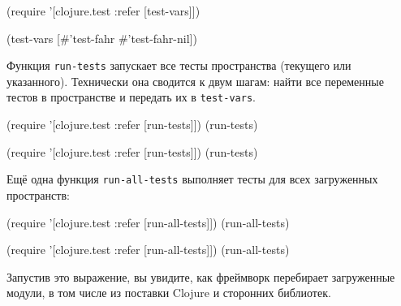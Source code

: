 \else

\begin{english}
  \begin{clojure}
(require '[clojure.test :refer [test-vars]])

(test-vars [#'test-fahr #'test-fahr-nil])
  \end{clojure}
\end{english}

\fi


Функция \verb|run-tests| запускает все тесты пространства (текущего или
указанного). Технически она сводится к двум шагам: найти все переменные тестов в
пространстве и передать их в \verb|test-vars|.

\ifnarrow

\begin{english}
  \begin{clojure}
(require
  '[clojure.test :refer [run-tests]])
(run-tests)
  \end{clojure}
\end{english}

\else

\begin{english}
  \begin{clojure}
(require '[clojure.test :refer [run-tests]])
(run-tests)
  \end{clojure}
\end{english}

\fi

Ещё одна функция \verb|run-all-tests| выполняет тесты для всех загруженных
пространств:

\ifnarrow

\begin{english}
  \begin{clojure}
(require
  '[clojure.test :refer [run-all-tests]])
(run-all-tests)
  \end{clojure}
\end{english}

\else

\begin{english}
  \begin{clojure}
(require '[clojure.test :refer [run-all-tests]])
(run-all-tests)
  \end{clojure}
\end{english}

\fi

Запустив это выражение, вы увидите, как фреймворк перебирает загруженные модули,
в том числе из поставки Clojure и сторонних библиотек.

